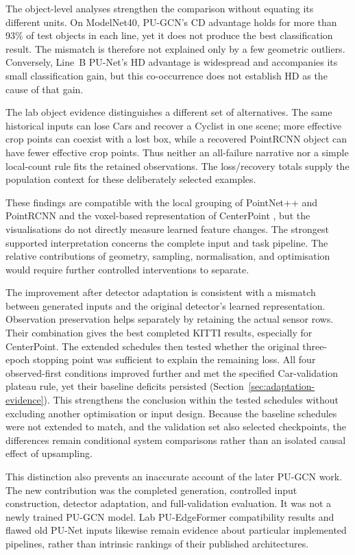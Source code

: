 The object-level analyses strengthen the comparison without equating its
different units. On ModelNet40, PU-GCN's CD advantage holds for more
than 93\% of test objects in each line, yet it does not produce the
best classification result. The mismatch is therefore not explained
only by a few geometric outliers. Conversely, Line~B PU-Net's HD
advantage is widespread and accompanies its small classification gain,
but this co-occurrence does not establish HD as the cause of that gain.

The lab object evidence distinguishes a different set of alternatives.
The same historical inputs can lose Cars and recover a Cyclist in one
scene; more effective crop points can coexist with a lost box, while
a recovered PointRCNN object can have fewer effective crop points.
Thus neither an all-failure narrative nor a simple local-count rule
fits the retained observations. The loss/recovery totals supply the
population context for these deliberately selected examples.

These findings are compatible with the local grouping of PointNet++
and PointRCNN and the voxel-based representation of CenterPoint
\cite{qi2017pointnetpp,shi2019pointrcnn,yin2021centerpoint}, but the
visualisations do not directly measure learned feature changes.
The strongest supported interpretation concerns the complete input
and task pipeline. The relative contributions of geometry, sampling,
normalisation, and optimisation would require further controlled
interventions to separate.

The improvement after detector adaptation is consistent with a mismatch
between generated inputs and the original detector's learned representation.
Observation preservation helps separately by retaining the actual sensor
rows. Their combination gives the best completed KITTI results, especially
for CenterPoint. The extended schedules then tested whether the original
three-epoch stopping point was sufficient to explain the remaining loss.
All four observed-first conditions improved further and met the specified
Car-validation plateau rule, yet their baseline deficits persisted
(Section~\ref{sec:adaptation-evidence}). This strengthens the conclusion
within the tested schedules without excluding another optimisation or
input design. Because the baseline schedules were not extended to match,
and the validation set also selected checkpoints, the differences remain
conditional system comparisons rather than an isolated causal effect
of upsampling.

This distinction also prevents an inaccurate account of the later PU-GCN
work. The new contribution was the completed generation, controlled input
construction, detector adaptation, and full-validation evaluation. It was
not a newly trained PU-GCN model. Lab PU-EdgeFormer compatibility results
and flawed old PU-Net inputs likewise remain evidence about particular
implemented pipelines, rather than intrinsic rankings of their published
architectures.

